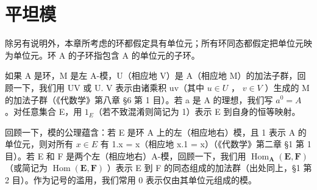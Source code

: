 \chapter{平坦模}

除另有说明外，本章所考虑的环都假定具有单位元；所有环同态都假定把单位元映为单位元。环 A 的子环指包含 A 的单位元的子环。

如果 A 是环，M 是左 A-模，U（相应地 V）是 A（相应地 M）的加法子群，回顾一下，我们用 UV 或 U. V 表示由诸乘积 uv（其中 \(u \in U\) ， \(v \in V\) ）生成的 M 的加法子群（《代数学》第八章 §6 第 1 目）。若 a 是 A 的理想，我们写 \(a^{0} = A\) 。对任意集合 E，用 \(1_{E}\)（若不致混淆则简记为 1）表示 E 到自身的恒等映射。

回顾一下，模的公理蕴含：若 E 是环 A 上的左（相应地右）模，且 1 表示 A 的单位元，则对所有 \(x \in E\) 有 1.x = x（相应地 x.1 = x）（《代数学》第二章 §1 第 1 目）。若 E 和 F 是两个左（相应地右）A-模，回顾一下，我们用 \(\operatorname{Hom}_{\mathbf{A}}(\mathbf{E}, \mathbf{F})\)（或简记为 \(\operatorname{Hom}(\mathbf{E}, \mathbf{F})\) ）表示 E 到 F 的同态组成的加法群（出处同上，§1 第 2 目）。作为记号的滥用，我们常用 0 表示仅由其单位元组成的模。

